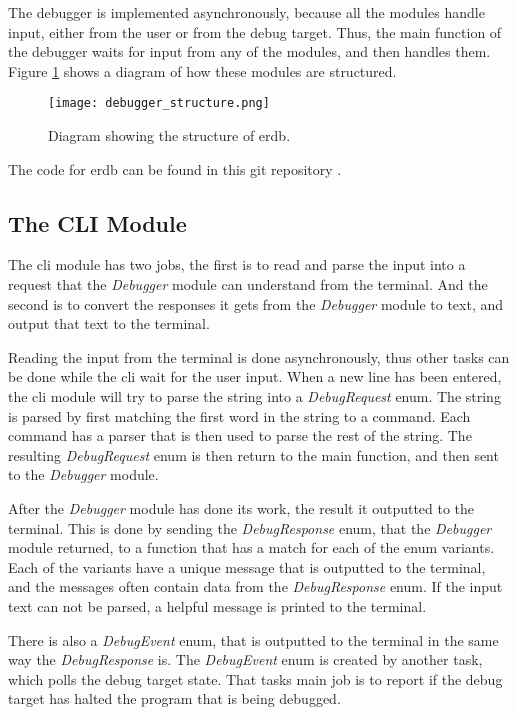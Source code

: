 The debugger is implemented asynchronously, because all the modules handle input, either from the user or from the debug target.
Thus, the main function of the debugger waits for input from any of the modules, and then handles them.
Figure \ref{fig:ERDStruct} shows a diagram of how these modules are structured.


\begin{figure}[h]
	\centering
	\texttt{[image: debugger\_structure.png]}
	\caption{Diagram showing the structure of \gls{erdb}.}
	\label{fig:ERDStruct}
\end{figure}


The code for \gls{erdb} can be found in this git repository \cite{erdb}.


\subsection{The CLI Module} 
The \acrshort{cli} module has two jobs, the first is to read and parse the input into a request that the \emph{Debugger} module can understand from the terminal.
And the second is to convert the responses it gets from the \emph{Debugger} module to text, and output that text to the terminal.


Reading the input from the terminal is done asynchronously, thus other tasks can be done while the \acrshort{cli} wait for the user input.
When a new line has been entered, the \acrshort{cli} module will try to parse the string into a \emph{DebugRequest} enum.
The string is parsed by first matching the first word in the string to a command.
Each command has a parser that is then used to parse the rest of the string.
The resulting \emph{DebugRequest} enum is then return to the main function, and then sent to the \emph{Debugger} module.



After the \emph{Debugger} module has done its work, the result it outputted to the terminal.
This is done by sending the \emph{DebugResponse} enum, that the \emph{Debugger} module returned, to a function that has a match for each of the enum variants.
Each of the variants have a unique message that is outputted to the terminal, and the messages often contain data from the \emph{DebugResponse} enum.
If the input text can not be parsed, a helpful message is printed to the terminal.



There is also a \emph{DebugEvent} enum, that is outputted to the terminal in the same way the \emph{DebugResponse} is.
The \emph{DebugEvent} enum is created by another task, which polls the debug target state.
That tasks main job is to report if the debug target has halted the program that is being debugged.



